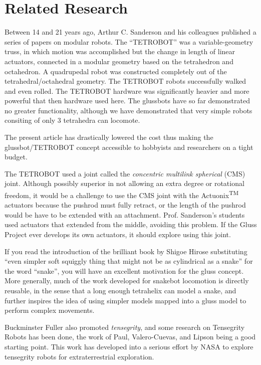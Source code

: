 \documentclass[11pt]{article}
\begin{document}
\section{Related Research}

Between 14 and 21 years ago, Arthur C. Sanderson and his colleagues published a series of
papers\cite{sanderson1996modular,lee2002dynamic,lee1999dynamics} on modular robots.
The ``TETROBOT'' was a variable-geometry truss, in which motion was accomplished but the change
in length of linear actuators, connected in a modular geometry based on the tetrahedron and octahedron.
A quadrupedal robot was constructed completely out of the tetrahedral/octahedral geometry.
The TETROBOT robots successfully walked and even rolled. The TETROBOT hardware was significantly
heavier and more powerful that then hardware used here. The glussbots have so far demonstrated no greater functionality,
although we have demonstrated that very simple robots consiting of only 3 tetrahedra can locomote.

The present article has drastically lowered the cost thus making the glussbot/TETROBOT concept
accessible to hobbyists and researchers on a tight budget.

The TETROBOT used a joint called the \emph{concentric multilink spherical} (CMS) joint. Although
possibly superior in not allowing an extra degree or rotational freedom, it would be a challenge to use the CMS
joint with the Actuonix\textsuperscript{TM} actuators because the pushrod must fully retract, or the length of the pushrod would be
have to be extended with an attachment. Prof. Sanderson's students used actuators that
extended from the middle, avoiding this problem. If the Gluss Project ever develops its own actuators, it should
explore using this joint.

If you read the introduction of the brilliant book by Shigoe Hirose\cite{hirose1993biologically} substituting
``even simpler soft squiggly thing that might not be as cylindrical as a snake'' for the word ``snake'', you will have
an excellent motivation for the gluss concept.  More generally, much of the work developed for snakebot
locomotion\cite{liljebäck2012snake} is directly reusable, in the sense that a long enough tetrahelix can
model a snake, and further inspires the idea of using simpler models mapped into a gluss model to perform
complex movements.

Buckminster Fuller also promoted \emph{tensegrity}, and some research on Tensegrity Robots has been done, the
work of Paul, Valero-Cuevas, and Lipson\cite{paul2006} being a good starting point.
This work has developed into a serious effort by NASA to explore tensegrity robots for extraterrestrial
exploration.
\end{document}
